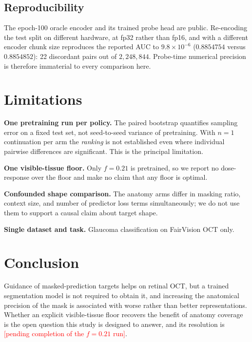 \documentclass{article}
\newcommand{\phtext}[1]{\textcolor{red}{[#1]}}
\begin{document}
\subsection{Reproducibility}

The epoch-100 oracle encoder and its trained probe head are public. Re-encoding
the test split on different hardware, at fp32 rather than fp16, and with a
different encoder chunk size reproduces the reported AUC to $9.8\times10^{-6}$
($0.8854754$ versus $0.8854852$): 22 discordant pairs out of $2{,}248{,}844$.
Probe-time numerical precision is therefore immaterial to every comparison here.

\section{Limitations}

\textbf{One pretraining run per policy.} The paired bootstrap quantifies
sampling error on a fixed test set, not seed-to-seed variance of pretraining.
With $n{=}1$ continuation per arm the \emph{ranking} is not established even
where individual pairwise differences are significant. This is the principal
limitation.

\textbf{One visible-tissue floor.} Only $f{=}0.21$ is pretrained, so we report
no dose-response over the floor and make no claim that any floor is optimal.

\textbf{Confounded shape comparison.} The anatomy arms differ in masking ratio,
context size, and number of predictor loss terms simultaneously; we do not use
them to support a causal claim about target shape.

\textbf{Single dataset and task.} Glaucoma classification on FairVision OCT only.

\section{Conclusion}

Guidance of masked-prediction targets helps on retinal OCT, but a trained
segmentation model is not required to obtain it, and increasing the anatomical
precision of the mask is associated with worse rather than better
representations. Whether an explicit visible-tissue floor recovers the benefit of
anatomy coverage is the open question this study is designed to answer, and its
resolution is \phtext{pending completion of the $f{=}0.21$ run}.



\end{document}
